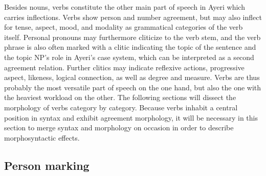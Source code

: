 Besides nouns, verbs constitute the other main part of speech in Ayeri which
carries inflections. Verbs show person and number agreement, but may also
inflect for tense, aspect, mood, and modality as grammatical categories of the
verb itself. Personal pronouns may furthermore cliticize to the verb stem, and
the verb phrase is also often marked with a clitic indicating the topic of the
sentence and the topic NP's role in Ayeri's case system, which can be
interpreted as a second agreement relation. Further clitics may indicate
reflexive actions, progressive aspect, likeness, logical connection, as well
as degree and measure. Verbs are thus probably the most versatile part of
speech on the one hand, but also the one with the heaviest workload on the
other. The following sections will dissect the morphology of verbs category by
category.
Because verbs inhabit a central 
position in syntax and exhibit agreement morphology, it will be necessary in
this section to merge syntax and morphology on occasion in order to describe
morphosyntactic effects.

\subsection{Person marking}
\label{subsec:persnumagr}

